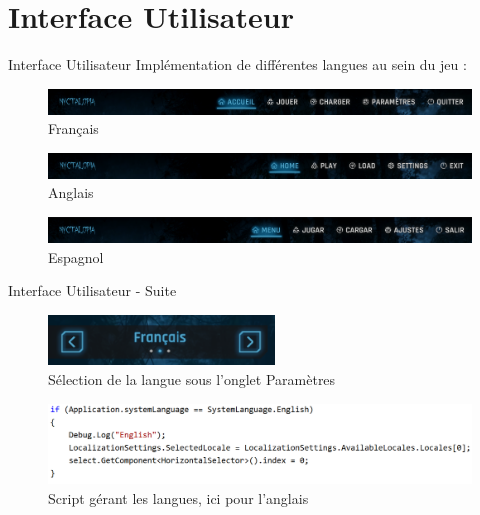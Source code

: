 \section{Interface Utilisateur}

\begin{frame}{Interface Utilisateur}
\setlength{\parindent}{5ex}
Implémentation de différentes langues au sein du jeu :

\begin{figure}
    \centering
    \includegraphics[width=12cm]{img/ui/mainmenu/fr.png}
    \caption{Français}
    \label{fig:fr}
\end{figure}
\begin{figure}
    \centering
    \includegraphics[width=12cm]{img/ui/mainmenu/en.png}
    \caption{Anglais}
    \label{fig:en}
\end{figure}
\begin{figure}
    \centering
    \includegraphics[width=12cm]{img/ui/mainmenu/es.png}
    \caption{Espagnol}
    \label{fig:es}
\end{figure}

\end{frame}


\begin{frame}{Interface Utilisateur - Suite}

\begin{figure}
    \centering
    \includegraphics[width=6cm]{img/ui/selector.png}
    \caption{Sélection de la langue sous l'onglet Paramètres}
    \label{fig:uilangset}
\end{figure}

\begin{figure}
    \centering
    \includegraphics[width=12cm]{img/ui/mainmenu/code.png}
    \caption{Script gérant les langues, ici pour l'anglais}
    \label{fig:uilang}
\end{figure}

\end{frame}

